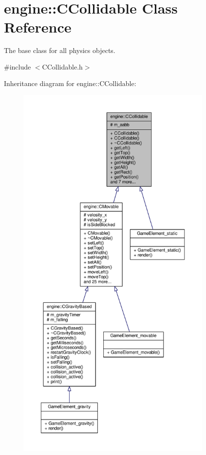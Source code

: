 \hypertarget{classengine_1_1CCollidable}{\section{engine\-:\-:C\-Collidable Class Reference}
\label{classengine_1_1CCollidable}
}


The base class for all physics objects.  




{\ttfamily \#include $<$C\-Collidable.\-h$>$}



Inheritance diagram for engine\-:\-:C\-Collidable\-:\nopagebreak
\begin{figure}[H]
\begin{center}
\leavevmode
\includegraphics[height=550pt]{classengine_1_1CCollidable__inherit__graph}
\end{center}
\end{figure}


